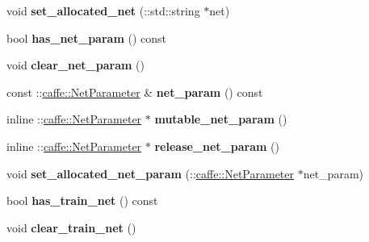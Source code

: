 \begin{DoxyCompactItemize}
void {\bfseries set\+\_\+allocated\+\_\+net} (\+::std\+::string $\ast$net)
\item 
\mbox{\label{classcaffe_1_1_solver_parameter_a3db057fb4ef4e1ed1f714d9437055df9}} 
bool {\bfseries has\+\_\+net\+\_\+param} () const
\item 
\mbox{\label{classcaffe_1_1_solver_parameter_a7d81d9152723a70653d2a8ea1299eea5}} 
void {\bfseries clear\+\_\+net\+\_\+param} ()
\item 
\mbox{\label{classcaffe_1_1_solver_parameter_a60a9bda69e37b29630eb76765cdd3c18}} 
const \+::\mbox{\hyperlink{classcaffe_1_1_net_parameter}{caffe\+::\+Net\+Parameter}} \& {\bfseries net\+\_\+param} () const
\item 
\mbox{\label{classcaffe_1_1_solver_parameter_ae09647fbabc2055a4c6ed91e6dfcbce9}} 
inline \+::\mbox{\hyperlink{classcaffe_1_1_net_parameter}{caffe\+::\+Net\+Parameter}} $\ast$ {\bfseries mutable\+\_\+net\+\_\+param} ()
\item 
\mbox{\label{classcaffe_1_1_solver_parameter_a5c4469b21c463e15e77201fbe851dc22}} 
inline \+::\mbox{\hyperlink{classcaffe_1_1_net_parameter}{caffe\+::\+Net\+Parameter}} $\ast$ {\bfseries release\+\_\+net\+\_\+param} ()
\item 
\mbox{\label{classcaffe_1_1_solver_parameter_a36ef6ac200c94c298c5bbb021f3d6eb4}} 
void {\bfseries set\+\_\+allocated\+\_\+net\+\_\+param} (\+::\mbox{\hyperlink{classcaffe_1_1_net_parameter}{caffe\+::\+Net\+Parameter}} $\ast$net\+\_\+param)
\item 
\mbox{\label{classcaffe_1_1_solver_parameter_ae29c741f5b6047eafef5c8361a2e06aa}} 
bool {\bfseries has\+\_\+train\+\_\+net} () const
\item 
\mbox{\label{classcaffe_1_1_solver_parameter_afeeb9d26b00b78423252af771fec9966}} 
void {\bfseries clear\+\_\+train\+\_\+net} ()
\item 
\mbox{\label{classcaffe_1_1_solver_parameter_a833a6a998c7e346814fd233f83d22f35}} 

\end{DoxyCompactItemize}
